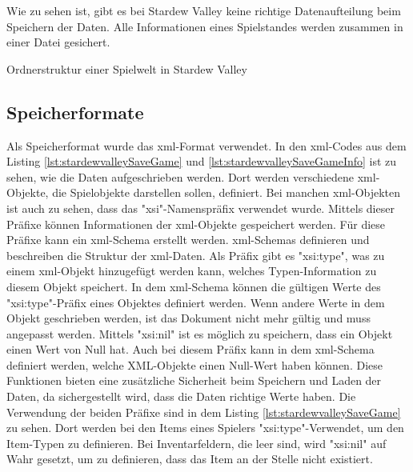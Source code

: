 Wie zu sehen ist, gibt es bei Stardew Valley keine richtige Datenaufteilung beim Speichern der Daten. Alle Informationen eines Spielstandes werden zusammen in einer Datei gesichert.

\begin{listing}[htp]
    \caption{Ordnerstruktur einer Spielwelt in Stardew Valley}
    \label{lst:ordnerStrukturStardewValley}
\end{listing}

\subsection{Speicherformate} \label{ssec:speicherformateStardew}
Als Speicherformat wurde das \ac{xml}-Format verwendet. In den \ac{xml}-Codes aus dem Listing \ref{lst:stardewvalleySaveGame} und \ref{lst:stardewvalleySaveGameInfo} ist zu sehen, wie die Daten aufgeschrieben werden. Dort werden verschiedene \ac{xml}-Objekte, die Spielobjekte darstellen sollen, definiert. Bei manchen \ac{xml}-Objekten ist auch zu sehen, dass das "xsi"-Namenspräfix verwendet wurde. Mittels dieser Präfixe können Informationen der \ac{xml}-Objekte gespeichert werden. Für diese Präfixe kann ein \ac{xml}-Schema erstellt werden. \ac{xml}-Schemas definieren und beschreiben die Struktur der \ac{xml}-Daten. Als Präfix gibt es "xsi:type", was zu einem \ac{xml}-Objekt hinzugefügt werden kann, welches Typen-Information zu diesem Objekt speichert. In dem \ac{xml}-Schema können die gültigen Werte des "xsi:type"-Präfix eines Objektes definiert werden. Wenn andere Werte in dem Objekt geschrieben werden, ist das Dokument nicht mehr gültig und muss angepasst werden. Mittels "xsi:nil" ist es möglich zu speichern, dass ein Objekt einen Wert von Null hat. Auch bei diesem Präfix kann in dem \ac{xml}-Schema definiert werden, welche XML-Objekte einen Null-Wert haben können. Diese Funktionen bieten eine zusätzliche Sicherheit beim Speichern und Laden der Daten, da sichergestellt wird, dass die Daten richtige Werte haben.\cite{w3Schema} Die Verwendung der beiden Präfixe sind in dem Listing \ref{lst:stardewvalleySaveGame} zu sehen. Dort werden bei den Items eines Spielers "xsi:type"-Verwendet, um den Item-Typen zu definieren. Bei Inventarfeldern, die leer sind, wird "xsi:nil" auf Wahr gesetzt, um zu definieren, dass das Item an der Stelle nicht existiert.

